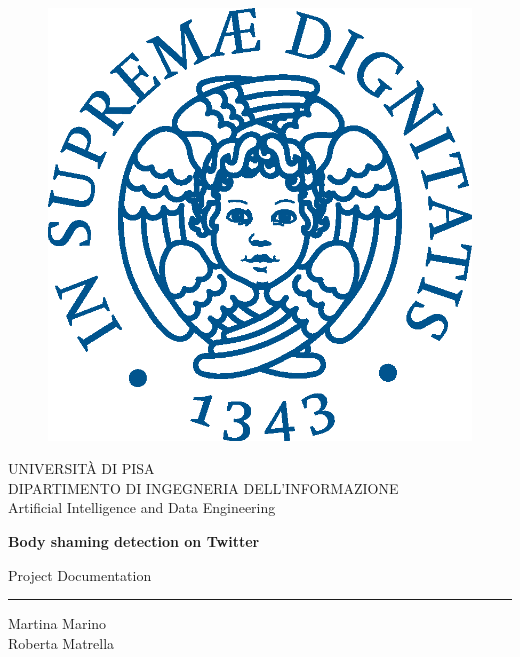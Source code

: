 \begin{titlepage}
\begin{figure}[!htb]
    \centering
    \includegraphics[keepaspectratio=true,scale=0.5]{images/frontispiece/cherubinFrontespizio.eps}
\end{figure}

\begin{center}
    \LARGE{UNIVERSITÀ DI PISA}
    \vspace{5mm}
    \\ \large{DIPARTIMENTO DI INGEGNERIA DELL'INFORMAZIONE}
    \vspace{5mm}
    \\ \LARGE{Artificial Intelligence and Data Engineering}
\end{center}

\vspace{15mm}
\begin{center}
    {\LARGE{\bf Body shaming detection on Twitter}}

    \vspace{10mm} %
    {\Large Project Documentation}\\
    
\end{center}


\par\noindent\rule{\textwidth}{0.4pt}
\vspace{5mm}

\hfill
\begin{minipage}[t]{0.47\textwidth}\raggedleft
	\large{Martina Marino}\normalsize\vspace{3mm} \\ \large{Roberta Matrella}
\end{minipage}

\vspace{50mm}


\end{titlepage}